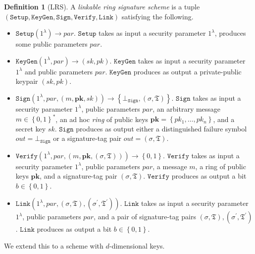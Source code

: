 \documentclass{mrl}
\theoremstyle{plain}
\theoremstyle{definition}
\newtheorem{defn}{Definition}[section]
\begin{document}
\begin{defn}[LRS]\label{def:lrs}
A \textit{linkable ring signature scheme} is a tuple $(\texttt{Setup}, \texttt{KeyGen}, \texttt{Sign}, \texttt{Verify}, \texttt{Link})$ satisfying the following. 
\begin{itemize}
\item $\texttt{Setup}(1^\lambda) \to \textit{par}$. $\texttt{Setup}$ takes as input a security parameter $1^\lambda$, produces some public parameters $\textit{par}$. 

\item $\texttt{KeyGen}(1^\lambda, \textit{par}) \to (sk, pk)$. $\texttt{KeyGen}$ takes as input a security parameter $1^\lambda$ and public parameters $\textit{par}$. $\texttt{KeyGen}$ produces as output a private-public keypair $(sk, pk)$. 

\item $\texttt{Sign}\left(1^\lambda, \textit{par}, (m, \textbf{pk}, sk)\right) \to \left\{\bot_{\texttt{Sign}}, (\sigma, \mathfrak{T})\right\}$. $\texttt{Sign}$ takes as input a security parameter $1^\lambda$, public parameters $\textit{par}$, an arbitrary message $m \in \left\{0,1\right\}^*$, an ad hoc \textit{ring} of public keys $\textbf{pk} = \left\{pk_1, \ldots, pk_n\right\}$, and a secret key $sk$. $\texttt{Sign}$ produces as output either a distinguished failure symbol $\textit{out} = \bot_{\texttt{Sign}}$ or a signature-tag pair $\textit{out} = (\sigma, \mathfrak{T})$.

\item $\texttt{Verify}\left(1^\lambda, \textit{par}, (m, \textbf{pk}, (\sigma, \mathfrak{T}))\right) \to \left\{0,1\right\}$. $\texttt{Verify}$ takes as input a security parameter $1^\lambda$, public parameters $\textit{par}$, a message $m$, a ring of public keys $\textbf{pk}$, and a signature-tag pair $(\sigma, \mathfrak{T})$. $\texttt{Verify}$ produces as output a bit $b \in \left\{0,1\right\}$.

\item $\texttt{Link}\left(1^\lambda, \textit{par}, (\sigma, \mathfrak{T}), (\sigma^\prime, \mathfrak{T}^\prime)\right)$. $\texttt{Link}$ takes as input a security parameter $1^\lambda$, public parameters $\textit{par}$, and a pair of signature-tag pairs $(\sigma, \mathfrak{T}), (\sigma^\prime, \mathfrak{T}^\prime)$. $\texttt{Link}$ produces as output a bit $b \in \left\{0,1\right\}$. 
\end{itemize}
\end{defn}

We extend this to a scheme with $d$-dimensional keys. 
\end{document}
